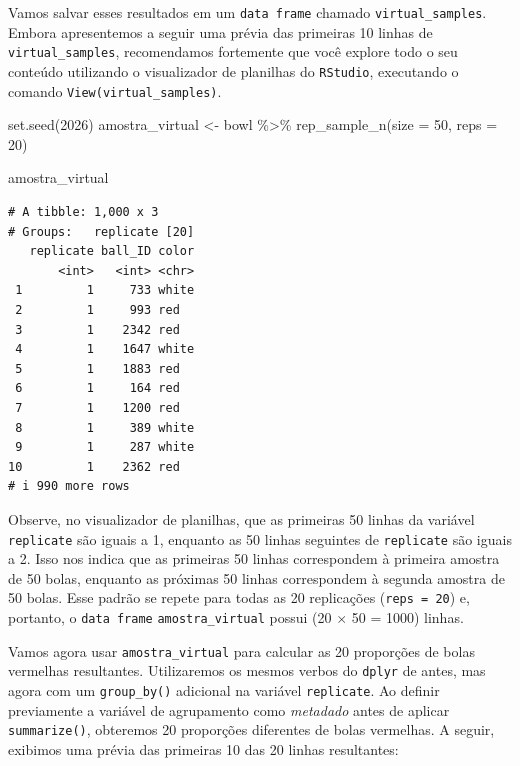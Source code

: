 \documentclass[
  letterpaper,
  DIV=11,
  numbers=noendperiod]{scrreprt}
\newenvironment{Shaded}{\begin{snugshade}}{\end{snugshade}}
\newcommand{\AttributeTok}[1]{\textcolor[rgb]{0.40,0.45,0.13}{#1}}
\newcommand{\DecValTok}[1]{\textcolor[rgb]{0.68,0.00,0.00}{#1}}
\newcommand{\FunctionTok}[1]{\textcolor[rgb]{0.28,0.35,0.67}{#1}}
\newcommand{\NormalTok}[1]{\textcolor[rgb]{0.00,0.23,0.31}{#1}}
\newcommand{\OtherTok}[1]{\textcolor[rgb]{0.00,0.23,0.31}{#1}}
\newcommand{\SpecialCharTok}[1]{\textcolor[rgb]{0.37,0.37,0.37}{#1}}
\begin{document}
Vamos salvar esses resultados em um \texttt{data\ frame} chamado
\texttt{virtual\_samples}. Embora apresentemos a seguir uma prévia das
primeiras 10 linhas de \texttt{virtual\_samples}, recomendamos
fortemente que você explore todo o seu conteúdo utilizando o
visualizador de planilhas do \texttt{RStudio}, executando o comando
\texttt{View(virtual\_samples)}.

\begin{Shaded}
\begin{Highlighting}[]
\FunctionTok{set.seed}\NormalTok{(}\DecValTok{2026}\NormalTok{)}
\NormalTok{amostra\_virtual }\OtherTok{\textless{}{-}}\NormalTok{ bowl }\SpecialCharTok{\%\textgreater{}\%}
\FunctionTok{rep\_sample\_n}\NormalTok{(}\AttributeTok{size =} \DecValTok{50}\NormalTok{, }\AttributeTok{reps =} \DecValTok{20}\NormalTok{)}

\NormalTok{amostra\_virtual}
\end{Highlighting}
\end{Shaded}

\begin{verbatim}
# A tibble: 1,000 x 3
# Groups:   replicate [20]
   replicate ball_ID color
       <int>   <int> <chr>
 1         1     733 white
 2         1     993 red  
 3         1    2342 red  
 4         1    1647 white
 5         1    1883 red  
 6         1     164 red  
 7         1    1200 red  
 8         1     389 white
 9         1     287 white
10         1    2362 red  
# i 990 more rows
\end{verbatim}

Observe, no visualizador de planilhas, que as primeiras 50 linhas da
variável \texttt{replicate} são iguais a 1, enquanto as 50 linhas
seguintes de \texttt{replicate} são iguais a 2. Isso nos indica que as
primeiras 50 linhas correspondem à primeira amostra de 50 bolas,
enquanto as próximas 50 linhas correspondem à segunda amostra de 50
bolas. Esse padrão se repete para todas as 20 replicações
(\texttt{reps\ =\ 20}) e, portanto, o \texttt{data\ frame}
\texttt{amostra\_virtual} possui (20 \(\times\) 50 = 1000) linhas.

Vamos agora usar \texttt{amostra\_virtual} para calcular as 20
proporções de bolas vermelhas resultantes. Utilizaremos os mesmos verbos
do \texttt{dplyr} de antes, mas agora com um \texttt{group\_by()}
adicional na variável \texttt{replicate}. Ao definir previamente a
variável de agrupamento como \emph{metadado} antes de aplicar
\texttt{summarize()}, obteremos 20 proporções diferentes de bolas
vermelhas. A seguir, exibimos uma prévia das primeiras 10 das 20 linhas
resultantes:
\end{document}
